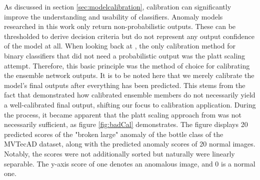 As discussed in section \ref{sec:modelcalibration}, calibration can significantly improve the understanding and usability of classifiers. Anomaly models researched in this work only return non-probabilistic 
outputs. These can be thresholded to derive decision criteria but do not represent any output confidence of the model at all. When looking back at \cite{Guo_2017_tempscalingetc}, the only calibration 
method for binary classifiers that did not need a probabilistic output was the platt scaling attempt. Therefore, this basic principle was the method of choice for calibrating the ensemble network 
outputs. It is to be noted here that we merely calibrate the model's final outputs after everything has been predicted. This stems from the fact that \cite{Wu_2021_shouldbecalibrated} demonstrated 
how calibrated ensemble members do not necessarily yield a well-calibrated final output, shifting our focus to calibration application. During the process, it became apparent that the platt 
scaling approach from \cite{Guo_2017_tempscalingetc} was not necessarily sufficient, as figure \ref{fig:badCal} demonstrates. The figure displays 20 predicted scores of the "broken large" anomaly of the bottle class of the MVTecAD dataset, 
along with the predicted anomaly scores of 20 normal images. Notably, the scores were not additionally sorted but naturally 
were linearly separable. The y-axis score of one denotes an anomalous image, and 0 is a normal one.


